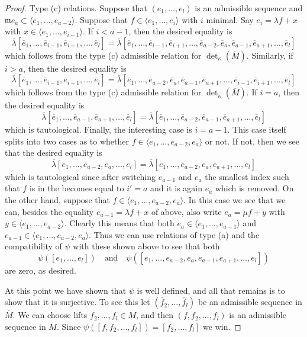 \begin{proof}
\medskip\noindent
Type (c) relations. Suppose that $(e_1, \ldots, e_l)$
is an admissible sequence and
$\mathfrak m e_a \subset \langle e_1, \ldots, e_{a - 2}\rangle$.
Suppose that $f \in \langle e_1, \ldots, e_i\rangle$ with $i$ minimal.
Say $e_i = \lambda f + x$ with $x \in \langle e_1, \ldots, e_{i - 1}\rangle$.
If $i < a - 1$, then the desired equality is
$$
\overline{\lambda}
[\overline{e}_1,
\ldots,
\overline{e}_{i - 1},
\overline{e}_{i + 1},
\ldots,
\overline{e}_l]
=
\overline{\lambda}
[\overline{e}_1,
\ldots,
\overline{e}_{i - 1},
\overline{e}_{i + 1},
\ldots,
\overline{e}_{a - 2},
\overline{e}_a,
\overline{e}_{a - 1},
\overline{e}_{a + 1},
\ldots,
\overline{e}_l]
$$
which follows from the type (c) admissible relation for
$\det_\kappa(\overline{M})$. Similarly, if $i > a$, then the
desired equality is
$$
\overline{\lambda}
[\overline{e}_1,
\ldots,
\overline{e}_{i - 1},
\overline{e}_{i + 1},
\ldots,
\overline{e}_l]
=
\overline{\lambda}
[\overline{e}_1,
\ldots,
\overline{e}_{a - 2},
\overline{e}_a,
\overline{e}_{a - 1},
\overline{e}_{a + 1},
\ldots,
\overline{e}_{i - 1},
\overline{e}_{i + 1},
\ldots,
\overline{e}_l]
$$
which follows from the type (c) admissible relation for
$\det_\kappa(\overline{M})$. If $i = a$, then the desired
equality is
$$
\overline{\lambda}
[\overline{e}_1,
\ldots,
\overline{e}_{a - 1},
\overline{e}_{a + 1},
\ldots,
\overline{e}_l]
=
\overline{\lambda}
[\overline{e}_1,
\ldots,
\overline{e}_{a - 2},
\overline{e}_{a - 1},
\overline{e}_{a + 1},
\ldots,
\overline{e}_l]
$$
which is tautological. Finally, the interesting case is $i = a - 1$.
This case itself splits into two cases as to whether
$f \in \langle e_1, \ldots, e_{a - 2}, e_a \rangle$ or not.
If not, then we see that the desired equality is
$$
\overline{\lambda}
[\overline{e}_1,
\ldots,
\overline{e}_{a - 2},
\overline{e}_a,
\ldots,
\overline{e}_l]
=
\overline{\lambda}
[\overline{e}_1,
\ldots,
\overline{e}_{a - 2},
\overline{e}_a,
\overline{e}_{a + 1},
\ldots,
\overline{e}_l]
$$
which is tautological since after switching $e_{a - 1}$ and $e_a$
the smallest index such that $f$ is in the becomes equal to
$i' = a$ and it is again $e_a$ which is removed. On the other
hand, suppose that $f \in \langle e_1, \ldots, e_{a - 2}, e_a \rangle$.
In this case we see that we can, besides the equality
$e_{a - 1} = \lambda f + x$ of above, also write
$e_a = \mu f + y$ with $y \in \langle e_1, \ldots, e_{a - 2}\rangle$.
Clearly this means that both
$e_a \in \langle e_1, \ldots, e_{a - 1} \rangle$ and
$e_{a - 1} \in \langle e_1, \ldots, e_{a - 2}, e_a\rangle$.
Thus we can use relations of type (a) and the compatibility of $\psi$
with these shown above to see that both
$$
\psi([e_1, \ldots, e_l])
\quad\text{and}\quad
\psi([e_1, \ldots, e_{a - 2}, e_a, e_{a - 1}, e_{a + 1}, \ldots, e_l])
$$
are zero, as desired.

\medskip\noindent
At this point we have shown that $\psi$ is well defined, and all that remains
is to show that it is surjective. To see this let
$(\overline{f}_2, \ldots, \overline{f}_l)$ be an admissible sequence
in $\overline{M}$. We can choose lifts $f_2, \ldots, f_l \in M$, and
then $(f, f_2, \ldots, f_l)$ is an admissible sequence in $M$.
Since $\psi([f, f_2, \ldots, f_l]) = [f_2, \ldots, f_l]$ we win.
\end{proof}

